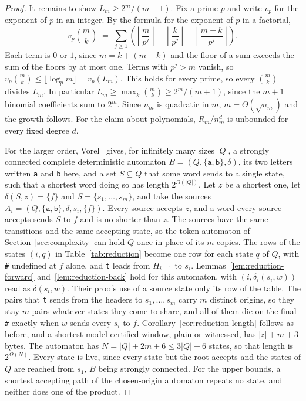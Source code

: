\documentclass[11pt,a4paper]{article}
\theoremstyle{definition}
\theoremstyle{plain}
\newcommand{\code}[1]{\texttt{#1}}
\begin{document}
\begin{proof}
It remains to show $L_m \geq 2^m / (m + 1)$. Fix a prime $p$ and write $v_p$ for the exponent of $p$ in an integer. By
the formula for the exponent of $p$ in a factorial,
\[ v_p\binom{m}{k} \;=\; \sum_{j \geq 1} \left( \left\lfloor \frac{m}{p^j} \right\rfloor - \left\lfloor
\frac{k}{p^j} \right\rfloor - \left\lfloor \frac{m - k}{p^j} \right\rfloor \right). \] Each term is $0$ or $1$, since
$m = k + (m - k)$ and the floor of a sum exceeds the sum of the floors by at most one. Terms with $p^j > m$ vanish, so
$v_p\binom{m}{k} \leq \lfloor \log_p m \rfloor = v_p(L_m)$. This holds for every prime, so every $\binom{m}{k}$ divides
$L_m$. In particular $L_m \geq \max_k \binom{m}{k} \geq 2^m / (m + 1)$, since the $m + 1$ binomial coefficients sum to
$2^m$. Since $n_m$ is quadratic in $m$, $m = \Theta(\sqrt{n_m})$ and the growth follows. For the claim about
polynomials, $R_m / n_m^d$ is unbounded for every fixed degree $d$.

For the larger order, Vorel~\cite[Theorem~8, p.~378]{vorel2014subset} gives, for infinitely many sizes $|Q|$, a strongly
connected complete deterministic automaton $B = (Q, \{\code{a}, \code{b}\}, \delta)$, its two letters written \code{a}
and \code{b} here, and a set $S \subseteq Q$ that some word sends to a single state, such that a shortest word doing so
has length $2^{\Omega(|Q|)}$. Let $z$ be a shortest one, let $\delta(S, z) = \{f\}$ and $S = \{s_1, \ldots, s_m\}$, and
take the sources $A_i = (Q, \{\code{a}, \code{b}\}, \delta, s_i, \{f\})$. Every source accepts $z$, and a word every
source accepts sends $S$ to $f$ and is no shorter than $z$. The sources have the same transitions and the same accepting
state, so the token automaton of Section~\ref{sec:complexity} can hold $Q$ once in place of its $m$ copies. The rows of
the states $(i, q)$ in Table~\ref{tab:reduction} become one row for each state $q$ of $Q$, with \code{\#} undefined at
$f$ alone, and \code{t} leads from $H_{i-1}$ to $s_i$. Lemmas~\ref{lem:reduction-forward} and~\ref{lem:reduction-back}
hold for this automaton, with $(i, \delta_i(s_i, w))$ read as $\delta(s_i, w)$. Their proofs use of a source state only
its row of the table. The pairs that \code{t} sends from the headers to $s_1, \ldots, s_m$ carry $m$ distinct origins,
so they stay $m$ pairs whatever states they come to share, and all of them die on the final \code{\#} exactly when $w$
sends every $s_i$ to $f$. Corollary~\ref{cor:reduction-length} follows as before, and a shortest model-certified window,
plain or witnessed, has $|z| + m + 3$ bytes. The automaton has $N = |Q| + 2m + 6 \leq 3 |Q| + 6$ states, so that length
is $2^{\Omega(N)}$. Every state is live, since every state but the root accepts and the states of $Q$ are reached from
$s_1$, $B$ being strongly connected. For the upper bounds, a shortest accepting path of the chosen-origin automaton
repeats no state, and neither does one of the product.
\end{proof}
\end{document}
